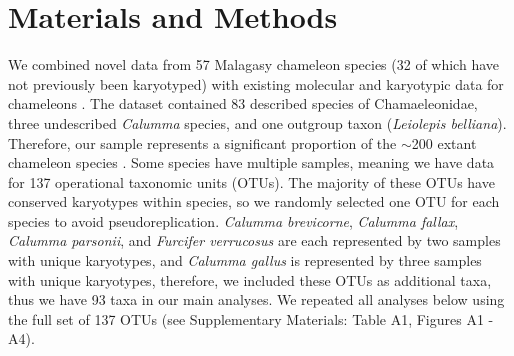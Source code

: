 \documentclass[a4paper, 12pt]{article}
\begin{document}
\section{Materials and Methods}

We combined novel data from 57 Malagasy chameleon species (32 of which have not previously been karyotyped) with existing molecular and karyotypic data for chameleons \citep{chameleon-data}. 
The dataset contained 83 described species of Chamaeleonidae, three undescribed \textit{Calumma} species, and one outgroup taxon (\textit{Leiolepis belliana}). 
Therefore, our sample represents a significant proportion of the $\sim$200 extant chameleon species \citep{uetz2022}. 
Some species have multiple samples, meaning we have data for 137 operational taxonomic units (OTUs). 
The majority of these OTUs have conserved karyotypes within species, so we randomly selected one OTU for each species to avoid pseudoreplication.
\textit{Calumma brevicorne}, \textit{Calumma fallax}, \textit{Calumma parsonii}, and \textit{Furcifer verrucosus} are each represented by two samples with unique karyotypes, and \textit{Calumma gallus} is represented by three samples with unique karyotypes, therefore, we included these OTUs as additional taxa, thus we have 93 taxa in our main analyses. 
We repeated all analyses below using the full set of 137 OTUs (see Supplementary Materials: Table A1, Figures A1 - A4).
\end{document}
